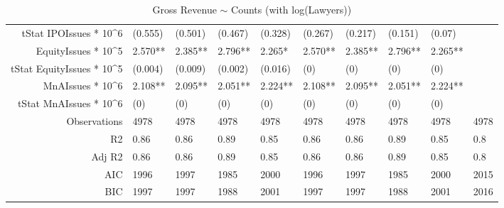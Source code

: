 \begin{table}[ht]
\begin{tabular}{rlllllllll}
  tStat IPOIssues * 10^6 & (0.555) & (0.501) & (0.467) & (0.328) & (0.267) & (0.217) & (0.151) & (0.07) &  \\ 
  EquityIssues * 10^5 & 2.570** & 2.385** & 2.796** & 2.265* & 2.570** & 2.385** & 2.796** & 2.265** &  \\ 
  tStat EquityIssues * 10^5 & (0.004) & (0.009) & (0.002) & (0.016) & (0) & (0) & (0) & (0) &  \\ 
  MnAIssues * 10^6 & 2.108** & 2.095** & 2.051** & 2.224** & 2.108** & 2.095** & 2.051** & 2.224** &  \\ 
  tStat MnAIssues * 10^6 & (0) & (0) & (0) & (0) & (0) & (0) & (0) & (0) &  \\ 
  Observations & 4978 & 4978 & 4978 & 4978 & 4978 & 4978 & 4978 & 4978 & 4978 \\ 
  R2 & 0.86 & 0.86 & 0.89 & 0.85 & 0.86 & 0.86 & 0.89 & 0.85 & 0.8 \\ 
  Adj R2 & 0.86 & 0.86 & 0.89 & 0.85 & 0.86 & 0.86 & 0.89 & 0.85 & 0.8 \\ 
  AIC & 1996 & 1997 & 1985 & 2000 & 1996 & 1997 & 1985 & 2000 & 2015 \\ 
  BIC & 1997 & 1997 & 1988 & 2001 & 1997 & 1997 & 1988 & 2001 & 2016 \\ 
   \hline
\end{tabular}
\caption{Gross Revenue $\sim$ Counts (with log(Lawyers))} 
\end{table}
